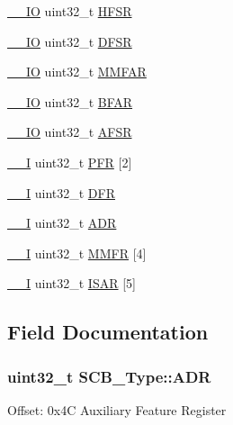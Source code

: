 \begin{DoxyCompactItemize}
\hyperlink{LPC17xx_8h_aec43007d9998a0a0e01faede4133d6be}{\+\_\+\+\_\+\+IO} uint32\+\_\+t \hyperlink{structSCB__Type_a7bed53391da4f66d8a2a236a839d4c3d}{H\+F\+SR}
\item 
\hyperlink{LPC17xx_8h_aec43007d9998a0a0e01faede4133d6be}{\+\_\+\+\_\+\+IO} uint32\+\_\+t \hyperlink{structSCB__Type_ad7d61d9525fa9162579c3da0b87bff8d}{D\+F\+SR}
\item 
\hyperlink{LPC17xx_8h_aec43007d9998a0a0e01faede4133d6be}{\+\_\+\+\_\+\+IO} uint32\+\_\+t \hyperlink{structSCB__Type_ac49b24b3f222508464f111772f2c44dd}{M\+M\+F\+AR}
\item 
\hyperlink{LPC17xx_8h_aec43007d9998a0a0e01faede4133d6be}{\+\_\+\+\_\+\+IO} uint32\+\_\+t \hyperlink{structSCB__Type_a31f79afe86c949c9862e7d5fce077c3a}{B\+F\+AR}
\item 
\hyperlink{LPC17xx_8h_aec43007d9998a0a0e01faede4133d6be}{\+\_\+\+\_\+\+IO} uint32\+\_\+t \hyperlink{structSCB__Type_aeb77053c84f49c261ab5b8374e8958ef}{A\+F\+SR}
\item 
\hyperlink{LPC17xx_8h_af63697ed9952cc71e1225efe205f6cd3}{\+\_\+\+\_\+I} uint32\+\_\+t \hyperlink{structSCB__Type_a3f51c43f952f3799951d0c54e76b0cb7}{P\+FR} \mbox{[}2\mbox{]}
\item 
\hyperlink{LPC17xx_8h_af63697ed9952cc71e1225efe205f6cd3}{\+\_\+\+\_\+I} uint32\+\_\+t \hyperlink{structSCB__Type_a586a5225467262b378c0f231ccc77f86}{D\+FR}
\item 
\hyperlink{LPC17xx_8h_af63697ed9952cc71e1225efe205f6cd3}{\+\_\+\+\_\+I} uint32\+\_\+t \hyperlink{structSCB__Type_aaedf846e435ed05c68784b40d3db2bf2}{A\+DR}
\item 
\hyperlink{LPC17xx_8h_af63697ed9952cc71e1225efe205f6cd3}{\+\_\+\+\_\+I} uint32\+\_\+t \hyperlink{structSCB__Type_aec2f8283d2737c6897188568a4214976}{M\+M\+FR} \mbox{[}4\mbox{]}
\item 
\hyperlink{LPC17xx_8h_af63697ed9952cc71e1225efe205f6cd3}{\+\_\+\+\_\+I} uint32\+\_\+t \hyperlink{structSCB__Type_acee8e458f054aac964268f4fe647ea4f}{I\+S\+AR} \mbox{[}5\mbox{]}
\end{DoxyCompactItemize}


\subsection{Field Documentation}
\subsubsection[{\texorpdfstring{A\+DR}{ADR}}]{ uint32\+\_\+t S\+C\+B\+\_\+\+Type\+::\+A\+DR}\hypertarget{structSCB__Type_aaedf846e435ed05c68784b40d3db2bf2}{}\label{structSCB__Type_aaedf846e435ed05c68784b40d3db2bf2}
Offset\+: 0x4C Auxiliary Feature Register 
